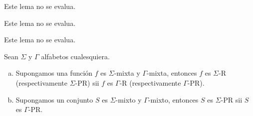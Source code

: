   \begin{lemma}
    \PN Este lema no se evalua.
  \end{lemma}

  \begin{lemma}
    \PN Este lema no se evalua.
  \end{lemma}

  \begin{lemma}
    \PN Este lema no se evalua.
  \end{lemma}

  \begin{theorem}
    \PN Sean $\Sigma$ y $\Gamma$ alfabetos cualesquiera.

    \begin{enumerate}[a)]
      \item Supongamos una función $f$ es $\Sigma$-mixta y $\Gamma$-mixta, entonces $f$ es $\Sigma$-R (respectivamente
        $\Sigma$-PR) sii $f$ es $\Gamma$-R (respectivamente $\Gamma$-PR).
      \item Supongamos un conjunto $S$ es $\Sigma$-mixto y $\Gamma$-mixto, entonces $S$ es $\Sigma$-PR sii $S$ es
        $\Gamma$-PR.
    \end{enumerate}
  \end{theorem}
